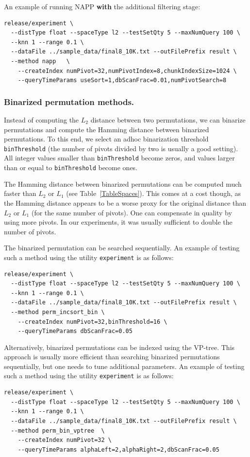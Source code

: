 \documentclass[runningheads,a4paper]{llncs}
\begin{document}
An example of running NAPP \textbf{with} the additional filtering stage:
{
\footnotesize
\begin{verbatim}
release/experiment \
  --distType float --spaceType l2 --testSetQty 5 --maxNumQuery 100 \
  --knn 1 --range 0.1 \
  --dataFile ../sample_data/final8_10K.txt --outFilePrefix result \
  --method napp   \
    --createIndex numPivot=32,numPivotIndex=8,chunkIndexSize=1024 \
    --queryTimeParams useSort=1,dbScanFrac=0.01,numPivotSearch=8
\end{verbatim}
}

\subsubsection{Binarized permutation methods.}\label{SectionPermBinary}
Instead of computing the $L_2$ distance between two permutations,
we can binarize permutations and compute the Hamming distance between
binarized permutations. 
To this end, we select an adhoc binarization threshold \texttt{binThreshold} (the
number of pivots divided by two is usually a good setting).
All integer values smaller than \texttt{binThreshold} become zeros,
and values larger than or equal to \texttt{binThreshold} become ones.

The Hamming distance between binarized permutations can be computed much faster than $L_2$ or $L_1$ (see Table~\ref{TableSpaces}). This comes at a cost though, as the Hamming distance appears to be a worse proxy for the original distance than $L_2$ or $L_1$ (for the same
number of pivots).
One can compensate in quality by using more pivots. In our experiments,
it was usually sufficient to double the number of pivots.

The binarized permutation can be searched sequentially. 
An example of testing such a method using the utility \texttt{experiment} is as follows:
{
\footnotesize
\begin{verbatim}
release/experiment \
  --distType float --spaceType l2 --testSetQty 5 --maxNumQuery 100 \
  --knn 1 --range 0.1 \
  --dataFile ../sample_data/final8_10K.txt --outFilePrefix result \
  --method perm_incsort_bin \
    --createIndex numPivot=32,binThreshold=16 \
    --queryTimeParams dbScanFrac=0.05
\end{verbatim}
}

Alternatively, binarized permutations can be indexed using the VP-tree.
This approach is usually more efficient than searching binarized permutations sequentially,
 but one needs to tune additional parameters.
An example of testing such a method using the utility \texttt{experiment} is as follows:
{
\footnotesize
\begin{verbatim}
release/experiment \
  --distType float --spaceType l2 --testSetQty 5 --maxNumQuery 100 \
  --knn 1 --range 0.1 \
  --dataFile ../sample_data/final8_10K.txt --outFilePrefix result \
  --method perm_bin_vptree  \
    --createIndex numPivot=32 \
    --queryTimeParams alphaLeft=2,alphaRight=2,dbScanFrac=0.05
\end{verbatim}
}
\end{document}
